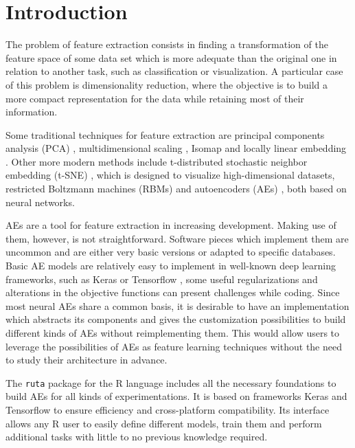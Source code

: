 

\section{Introduction}
\label{p2sec.intro}


The problem of feature extraction consists in finding a transformation of the feature space of some data set which is more adequate than the original one in relation to another task, such as classification or visualization. A particular case of this problem is dimensionality reduction, where the objective is to build a more compact representation for the data while retaining most of their information.

Some traditional techniques for feature extraction are principal components analysis (PCA) , multidimensional scaling , Isomap  and locally linear embedding . Other more modern methods include t-distributed stochastic neighbor embedding (t-SNE) , which is designed to visualize high-dimensional datasets, restricted Boltzmann machines (RBMs)  and autoencoders (AEs) , both based on neural networks. 

AEs are a tool for feature extraction in increasing development. {Making use of them, however, is not straightforward.} Software pieces which implement them are uncommon and are either very basic versions or adapted to specific databases. {Basic AE models are relatively easy to implement in well-known deep learning frameworks, such as Keras  or Tensorflow , some useful regularizations and alterations in the objective functions can present challenges while coding.} Since most neural AEs share a common basis, it is desirable to have an implementation which abstracts its components and gives the customization possibilities to build different kinds of AEs without reimplementing them. {This would allow users to leverage the possibilities of AEs as feature learning techniques without the need to study their architecture in advance.}

The \texttt{ruta} package for the R language includes all the necessary foundations to build AEs for all kinds of experimentations. It is based on frameworks Keras and Tensorflow to ensure efficiency and cross-platform compatibility. {Its interface allows any R user to easily define different models, train them and perform additional tasks with little to no previous knowledge required.}



